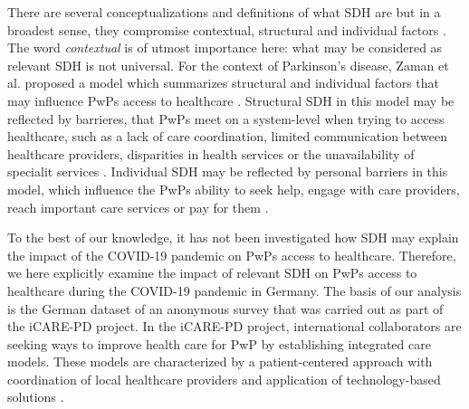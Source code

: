 \documentclass{bmcart}
\begin{document}
	There are several conceptualizations and definitions of what SDH are but in a broadest sense, they compromise contextual, structural and individual factors \cite{world2010conceptual}. The word \textit{contextual} is of utmost importance here: what may be considered as relevant SDH is not universal. For the context of Parkinson's disease, Zaman  et al. proposed a model which summarizes structural and individual factors that may influence PwPs access to healthcare \cite{zaman2021barriers}. 
	Structural SDH in this model may be reflected by barrieres, that PwPs meet on a system-level when trying to access healthcare, such as a lack of care coordination, limited communication between healthcare providers, disparities in health services or the unavailability of specialit services \cite{zaman2021barriers}. Individual SDH may be reflected by personal barriers in this model, which influence the PwPs ability to seek help, engage with care providers, reach important care services or pay for them \cite{zaman2021barriers}. 
	
	To the best of our knowledge, it has not been investigated how SDH may explain the impact of the COVID-19 pandemic on PwPs access to healthcare. Therefore, we here explicitly examine the impact of relevant SDH on PwPs access to healthcare during the COVID-19 pandemic in Germany. The basis of our analysis is the German dataset of an anonymous survey that was carried out as part of the iCARE-PD project. In the iCARE-PD project, international collaborators are seeking ways to improve health care for PwP by establishing integrated care models. These models are characterized by a patient-centered approach with coordination of local healthcare providers and application of technology-based solutions \cite{fabbri2020moving}.  
	
\end{document}
